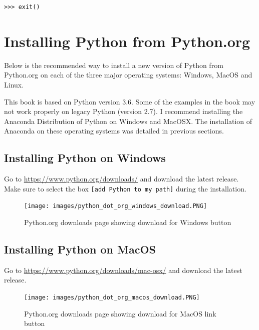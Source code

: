 \documentclass{book}
\begin{document}
\begin{lstlisting}
>>> exit()
\end{lstlisting}
    




    
        \section{Installing Python from
Python.org}\label{installing-python-from-python.org}
    




    
        Below is the recommended way to install a new version of Python from
Python.org on each of the three major operating systems: Windows, MacOS
and Linux.

This book is based on Python version 3.6. Some of the examples in the
book may not work properly on legacy Python (version 2.7). I recommend
installing the Anaconda Distribution of Python on Windows and MacOSX.
The installation of Anaconda on these operating systems was detailed in
previous sections.
    




    
        \subsection{Installing Python on
Windows}\label{installing-python-on-windows}

Go to \url{https://www.python.org/downloads/} and download the latest
release. Make sure to select the box \lstinline![add Python to my path]!
during the installation.

\begin{figure}
\centering
\texttt{[image: images/python\_dot\_org\_windows\_download.PNG]}
\caption{Python.org downloads page showing download for Windows button}
\end{figure}
    




    
        \subsection{Installing Python on
MacOS}\label{installing-python-on-macos}

Go to \url{https://www.python.org/downloads/mac-osx/} and download the
latest release.

\begin{figure}
\centering
\texttt{[image: images/python\_dot\_org\_macos\_download.PNG]}
\caption{Python.org downloads page showing download for MacOS link
button}
\end{figure}
    
\end{document}
